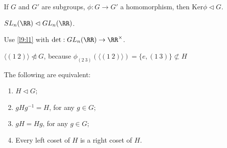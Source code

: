 \begin{lem} \label{l9:l1}
	If $G$ and $G'$ are subgroups, $\phi: G \to G'$ a homomorphism, then $\mathrm{Ker}\phi \triangleleft G$.
\end{lem}

\begin{exmp}
	$SL_n(\RR) \vartriangleleft GL_n(\RR)$.

	Use \cref{l9:l1} with $\mathrm{det}: GL_n(\RR) \to \RR^\times$.
\end{exmp}

\begin{exmp}
	$ \langle (1\ 2) \rangle \ntriangleleft G$, because $\phi_{(2\ 3)}(\langle (1\ 2) \rangle) = \{e, (1\ 3)\} \not \subset H$
\end{exmp}

\begin{thm} The following are equivalent:
	\begin{enumerate}
		\item $H \vartriangleleft G$;
		\item $gHg^{-1} = H$, for any $g \in G$;
		\item $gH = Hg$, for any  $g \in G$;
		\item Every left coset of $H$ is a right coset of $H$.
	\end{enumerate}
\end{thm}
